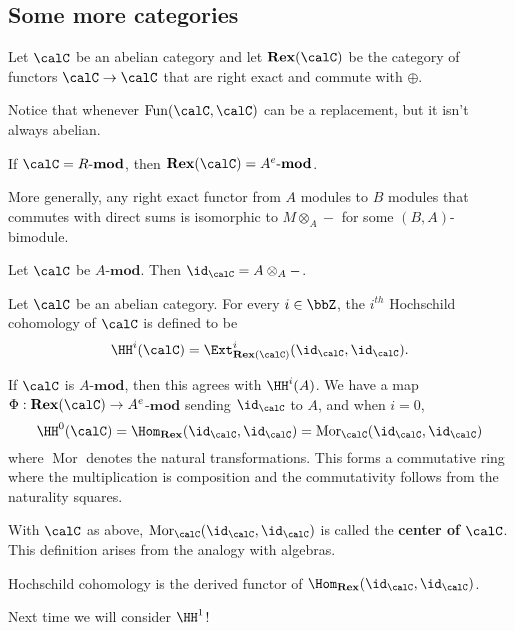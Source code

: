 \documentclass[12pt]{article}
\begin{document}
\subsection{Some more categories}
Let $\calC$ be an abelian category and let $\mathbf{Rex}(\calC)$ be the category of functors $\calC\to \calC$
that are right exact and commute with $\oplus.$
\begin{rmk}
	Notice that whenever $\operatorname{Fun}(\calC,\calC)$ can be a replacement, but it isn't always abelian.
\end{rmk}
\begin{thm}[Watts]
	If $\calC=R\text{-}\mathbf{mod}$, then $\mathbf{Rex}(\calC)=A^e\text{-}\mathbf{mod}$.
\end{thm}
\begin{rmk}
	More generally, any right exact functor from $A$ modules to $B$ modules that commutes with direct sums
	is isomorphic to $M\otimes_A -$ for some $(B,A)$-bimodule.
\end{rmk}
\begin{lem}
	Let $\calC$ be $A$-$\mathbf{mod}$. Then $\id_\calC=A\otimes_A-$.
\end{lem}
\begin{defn}
	Let $\calC$ be an abelian category. For every $i\in\bbZ$, the $i^{th}$ Hochschild cohomology
	of $\calC$ is defined to be
	\[\HH^i(\calC)=\Ext^i_{\mathbf{Rex}(\calC)}(\id_\calC,\id_\calC).\]
\end{defn}
\begin{rmk}
	If $\calC$ is $A$-$\mathbf{mod}$, then this agrees with $\HH^i(A)$. We have a map $\Phi:\mathbf{Rex}(\calC)\to A^e$-$\mathbf{mod}$
	sending $\id_\calC$ to $A$, and when $i=0$,
	\[\HH^0(\calC)=\Hom_{\mathbf{Rex}}(\id_\calC,\id_\calC)=\operatorname{Mor}_\calC(\id_\calC,\id_\calC)\]
	where $\operatorname{Mor}$ denotes the natural transformations. This forms a commutative ring where the multiplication
	is composition and the commutativity follows from the naturality squares.
\end{rmk}
\begin{defn}
	With $\calC$ as above, $\operatorname{Mor}_\calC(\id_\calC,\id_\calC)$ is called the \textbf{center of $\calC$}. This definition
	arises from the analogy with algebras.
\end{defn}
\begin{rmk}
	Hochschild cohomology is the derived functor of $\Hom_{\mathbf{Rex}}(\id_\calC,\id_\calC)$.
\end{rmk}
Next time we will consider $\HH^1$!
\end{document}
